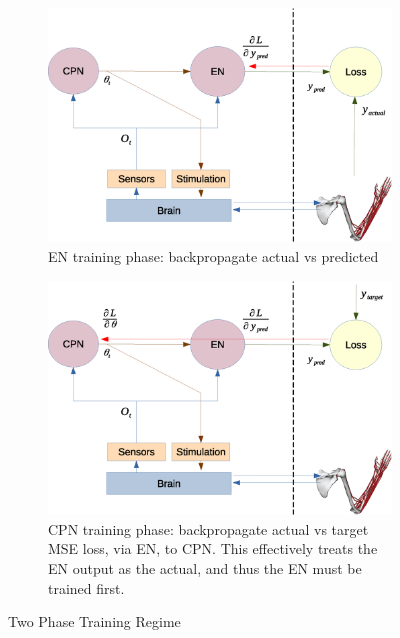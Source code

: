 \documentclass[12pt]{iopart}
\begin{document}
\begin{figure}
	\centering
	\begin{subfigure}[c]{0.48\textwidth}
		\centering
		\includegraphics[width=\textwidth]{backprop_en.eps}
		\caption{EN training phase: backpropagate actual vs predicted}
	\end{subfigure}
	\hfill
	\begin{subfigure}[c]{0.48\textwidth}
		\centering
		\includegraphics[width=\textwidth]{backprop_cpn.eps}
		\caption{CPN training phase: backpropagate actual vs target MSE loss, via EN, to CPN. This effectively treats the EN output as the actual, and thus the EN must be trained first.}
	\end{subfigure}
	\hfill
\caption{Two Phase Training Regime}
\label{fig:training}
\end{figure}
\end{document}
